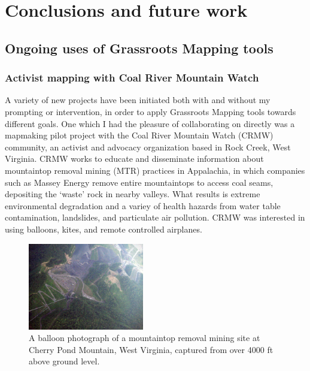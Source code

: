 \documentclass[11pt,oneside,notitlepage]{report}
\begin{document}
\chapter{Conclusions and future work}

\section{Ongoing uses of Grassroots Mapping tools}
\label{sec:ongoinguses}

\subsection{Activist mapping with Coal River Mountain Watch}
\label{subsec:crmw}

A variety of new projects have been initiated both with and without my prompting or intervention, in order to apply Grassroots Mapping tools towards different goals. One which I had the pleasure of collaborating on directly was a mapmaking pilot project with the Coal River Mountain Watch (CRMW) community, an activist and advocacy organization based in Rock Creek, West Virginia. CRMW works to educate and disseminate information about mountaintop removal mining (MTR) practices in Appalachia, in which companies such as Massey Energy remove entire mountaintops to access coal seams, depositing the `waste' rock in nearby valleys. What results is extreme environmental degradation and a variey of health hazards from water table contamination, landslides, and particulate air pollution. CRMW was interested in using balloons, kites, and remote controlled airplanes. 

\begin{figure}
	\begin{flushright}
		\includegraphics[width=0.45\textwidth]{images/marsh-fork-cherry-pond.jpg}
		\caption{A balloon photograph of a mountaintop removal mining site at Cherry Pond Mountain, West Virginia, captured from over 4000 ft above ground level.}
	\end{flushright}
\end{figure}
\end{document}
